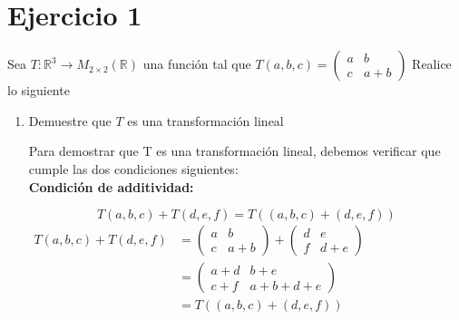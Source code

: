 \section*{Ejercicio 1}

Sea $T: \mathbb{R}^{3} \rightarrow M_{2\times2}(\mathbb{R})$ 
una función tal que $T(a,b,c) = \left(
                                    \begin{array}{cc}
                                        a & b \\
                                        c & a+b
                                    \end{array}
                                \right)$ Realice lo siguiente
\begin{enumerate}
    \item Demuestre que $T$ es una transformación lineal 
    
    Para demostrar que T es una transformación lineal,
    debemos verificar que cumple las dos condiciones 
    siguientes:\\

    \textbf{Condición de additividad:}

    $$ T(a,b,c)+T(d,e,f)=T((a,b,c)+(d,e,f)) $$
    $
    \begin{aligned}
        T(a,b,c) + T(d,e,f) &=  \left(
                                \begin{array}{cc}
                                    a & b \\
                                    c & a+b
                                \end{array}
                                \right) +
                                \left(
                                \begin{array}{cc}
                                    d & e \\
                                    f & d+e
                                \end{array}
                                \right) \\
                                &= \left(
                                \begin{array}{cc}
                                    a+d & b+e \\
                                    c+f & a+b+d+e
                                \end{array}
                                \right) \\
        &= T((a,b,c)+(d,e,f))
    \end{aligned}
    $\\


\end{enumerate}
